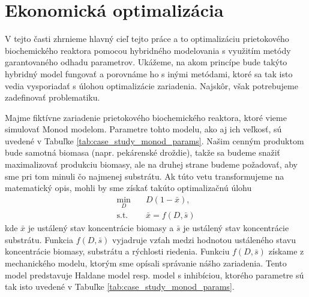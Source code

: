 \section{Ekonomická optimalizácia}
V tejto časti zhrnieme hlavný cieľ tejto práce a to optimalizáciu prietokového biochemického reaktora pomocou hybridného modelovania s využitím metódy garantovaného odhadu parametrov. Ukážeme, na akom princípe bude takýto hybridný model fungovať a porovnáme ho s inými metódami, ktoré sa tak isto vedia vysporiadať s úlohou optimalizácie zariadenia. Najskôr, však potrebujeme zadefinovať problematiku.

Majme fiktívne zariadenie prietokového biochemického reaktora, ktoré vieme simulovať Monod modelom. Parametre tohto modelu, ako aj ich veľkosť, sú uvedené v Tabuľke \ref{tab:case_study_monod_params}. Našim cenným produktom bude samotná biomasa (napr. pekárenské droždie), takže sa budeme snažiť maximalizovať produkciu biomasy, ale na druhej strane budeme požadovať, aby sme pri tom minuli čo najmenej substrátu. Ak túto vetu transformujeme na matematický opis, mohli by sme získať takúto optimalizačnú úlohu
\begin{equation}
	\label{eq:chemostat_opt_general}
	\begin{split}
		\min_{D} &\quad D\left(1-\bar{x}\right), \\
		\text{s.t.} &\quad \bar{x} = f(D,\bar{s})
	\end{split}
\end{equation}
kde $ \bar{x} $ je ustálený stav koncentrácie biomasy a $ \bar{s} $ je ustálený stav koncentrácie substrátu. Funkcia $ f(D,\bar{s}) $ vyjadruje vzťah medzi hodnotou ustáleného stavu koncentrácie biomasy, substrátu a rýchlosti riedenia. Funkciu $ f(D,\bar{s}) $ získame z mechanického modelu, ktorým sme opísali správanie nášho zariadenia. Tento model predstavuje Haldane model resp. model s inhibíciou, ktorého parametre sú tak isto uvedené v Tabuľke \ref{tab:case_study_monod_params}. 

